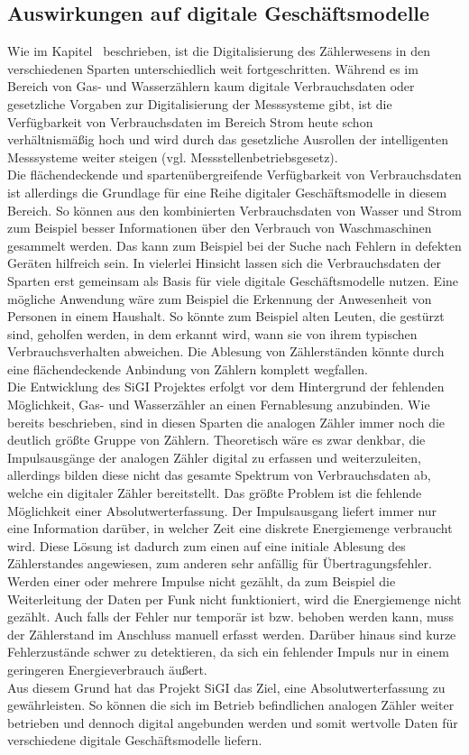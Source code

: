 \subsection{Auswirkungen auf digitale Geschäftsmodelle}\label{subsec:Smart Meter Rollout}
    Wie im Kapitel~ beschrieben, ist die Digitalisierung des Zählerwesens in den verschiedenen Sparten unterschiedlich weit fortgeschritten. Während es im Bereich von Gas- und Wasserzählern kaum digitale Verbrauchsdaten oder gesetzliche Vorgaben zur Digitalisierung der Messsysteme gibt, ist die Verfügbarkeit von Verbrauchsdaten im Bereich Strom heute schon verhältnismäßig hoch und wird durch das gesetzliche Ausrollen der intelligenten Messsysteme weiter steigen (vgl. Messstellenbetriebsgesetz).\\ Die flächendeckende und spartenübergreifende Verfügbarkeit von Verbrauchsdaten ist allerdings die Grundlage für eine Reihe digitaler Geschäftsmodelle in diesem Bereich. So können aus den kombinierten Verbrauchsdaten von Wasser und Strom zum Beispiel besser Informationen über den Verbrauch von Waschmaschinen gesammelt werden. Das kann zum Beispiel bei der Suche nach Fehlern in defekten Geräten hilfreich sein. In vielerlei Hinsicht lassen sich die Verbrauchsdaten der Sparten erst gemeinsam als Basis für viele digitale Geschäftsmodelle nutzen. Eine mögliche Anwendung wäre zum Beispiel die Erkennung der Anwesenheit von Personen in einem Haushalt. So könnte zum Beispiel alten Leuten, die gestürzt sind, geholfen werden, in dem erkannt wird, wann sie von ihrem typischen Verbrauchsverhalten abweichen. Die Ablesung von Zählerständen könnte durch eine flächendeckende Anbindung von Zählern komplett wegfallen.\\ Die Entwicklung des SiGI Projektes erfolgt vor dem Hintergrund der fehlenden Möglichkeit, Gas- und Wasserzähler an einen Fernablesung anzubinden. Wie bereits beschrieben, sind in diesen Sparten die analogen Zähler immer noch die deutlich größte Gruppe von Zählern. Theoretisch wäre es zwar denkbar, die Impulsausgänge der analogen Zähler digital zu erfassen und weiterzuleiten, allerdings bilden diese nicht das gesamte Spektrum von Verbrauchsdaten ab, welche ein digitaler Zähler bereitstellt. Das größte Problem ist die fehlende Möglichkeit einer Absolutwerterfassung. Der Impulsausgang liefert immer nur eine Information darüber, in welcher Zeit eine diskrete Energiemenge verbraucht wird. Diese Lösung ist dadurch zum einen auf eine initiale Ablesung des Zählerstandes angewiesen, zum anderen sehr anfällig für Übertragungsfehler. Werden einer oder mehrere Impulse nicht gezählt, da zum Beispiel die Weiterleitung der Daten per Funk nicht funktioniert, wird die Energiemenge nicht gezählt. Auch falls der Fehler nur temporär ist bzw. behoben werden kann, muss der Zählerstand im Anschluss manuell erfasst werden. Darüber hinaus sind kurze Fehlerzustände schwer zu detektieren, da sich ein fehlender Impuls nur in einem geringeren Energieverbrauch äußert.\\ Aus diesem Grund hat das Projekt SiGI das Ziel, eine Absolutwerterfassung zu gewährleisten. So können die sich im Betrieb befindlichen analogen Zähler weiter betrieben und dennoch digital angebunden werden und somit wertvolle Daten für verschiedene digitale Geschäftsmodelle liefern. 
